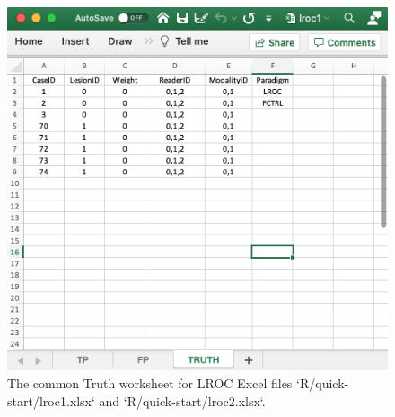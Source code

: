 \documentclass[
]{book}
\begin{document}
\begin{figure}

{\centering \includegraphics[width=1\linewidth]{images/quick-start/lroc1Truth} 

}

\caption{The common Truth worksheet for LROC Excel files `R/quick-start/lroc1.xlsx` and `R/quick-start/lroc2.xlsx`.}\label{fig:quick-start-lroc-truth}
\end{figure}
\end{document}
